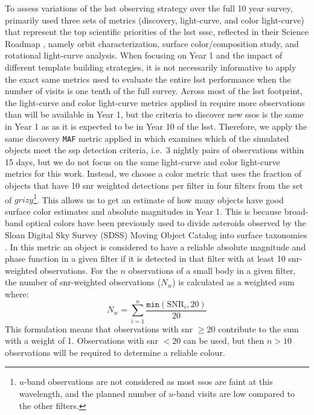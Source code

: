 \documentclass[preprintm,linenumbers]{aastex631}
\newcommand{\maf}{\texttt{MAF}\xspace}
\begin{document}
To assess variations of the \gls*{lsst} observing strategy over the full 10 year survey, \cite{schwambTuningLegacySurvey2023} primarily used three sets of metrics (discovery, light-curve, and color light-curve) that represent the top scientific priorities of the \gls*{lsst} \gls*{sssc}, reflected in their Science Roadmap \citep{2018arXiv180201783S}, namely orbit characterization, surface color/composition study, and rotational light-curve analysis. 
When focusing on Year 1 and the impact of different template building strategies, it is not necessarily informative to apply the exact same metrics used to evaluate the entire \gls*{lsst} performance when the number of visits is one tenth of the full survey. 
Across most of the \gls*{lsst} footprint, the light-curve and color light-curve metrics applied in \cite{schwambTuningLegacySurvey2023} require more observations than will be available in Year 1, but the criteria to discover new \glspl*{sso} is the same in Year 1 as as it is expected to be in Year 10 of the \gls*{lsst}. 
Therefore, we apply the same discovery \maf metric applied in \cite{schwambTuningLegacySurvey2023} which examines which of the simulated objects meet the \gls*{ssp} detection criteria, i.e.\ 3 nightly pairs of observations within 15 days, but we do not focus on the same light-curve and color light-curve metrics for this work. 
Instead, we choose a color metric that uses the fraction of objects that have 10 \gls*{snr} weighted detections per filter in four filters from the set of $grizy$\footnote{$u$-band observations are not considered as most \glspl*{sso} are faint at this wavelength, and the planned number of $u$-band visits are low compared to the other filters.}. 
This allows us to get an estimate of how many objects have good surface color estimates and absolute magnitudes in Year 1. 
This is because broad-band optical colors have been previously used to divide asteroids observed by the Sloan Digital Sky Survey (SDSS) Moving Object Catalog \citep{2001AJ....122.2749I,2002AJ....124.2943I,juricComparisonPositionsMagnitudes2002} into surface taxonomies \citep{2013Icar..226..723D,sergeyevMillionAsteroidObservations2021}. 
In this metric an object is considered to have a reliable absolute magnitude and phase function in a given filter if it is detected in that filter with at least 10 \gls*{snr}-weighted observations. 
For the $n$ observations of a small body in a given filter, the number of \gls*{snr}-weighted observations ($N_w$) is calculated as a weighted sum where:
\begin{equation}
	N_w =  \sum_{i=1}^n\frac{\texttt{min}(\mathrm{SNR}_i, 20)}{20}
\end{equation}
This formulation means that observations with \gls*{snr} $\ge$20 contribute to the sum with a weight of 1.
Observations with \gls*{snr} $<20$ can be used, but then $n>10$ observations will be required to determine a reliable colour.
\end{document}
